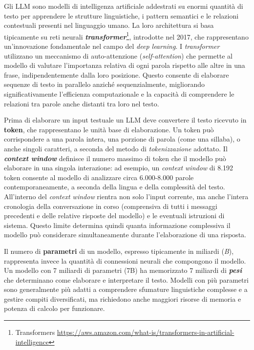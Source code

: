 \documentclass[12pt,twoside]{report}
\begin{document}
Gli LLM sono modelli di intelligenza artificiale addestrati su enormi quantità di testo per apprendere le strutture linguistiche, i pattern semantici e le relazioni contestuali presenti nel linguaggio umano. La loro architettura si basa tipicamente su reti neurali \textbf{\textit{transformer}}\footnote{Transformers \url{https://aws.amazon.com/what-is/transformers-in-artificial-intelligence}}, introdotte nel 2017, che rappresentano un'innovazione fondamentale nel campo del \textit{deep learning}. I \textit{transformer} utilizzano un meccanismo di auto-attenzione (\textit{self-attention}) che permette al modello di valutare l'importanza relativa di ogni parola rispetto alle altre in una frase, indipendentemente dalla loro posizione. Questo consente di elaborare sequenze di testo in parallelo anziché sequenzialmente, migliorando significativamente l'efficienza computazionale e la capacità di comprendere le relazioni tra parole anche distanti tra loro nel testo.

Prima di elaborare un input testuale un LLM deve convertere il testo ricevuto in \textbf{token}, che rappresentano le unità base di elaborazione. Un token può corrispondere a una parola intera, una porzione di parola (come una sillaba), o anche singoli caratteri, a seconda del metodo di \textit{tokenizzazione} adottato. Il \textbf{\textit{context window}} definisce il numero massimo di token che il modello può elaborare in una singola interazione: ad esempio, un \textit{context window} di 8.192 token consente al modello di analizzare circa 6.000-8.000 parole contemporaneamente, a seconda della lingua e della complessità del testo. All'interno del \textit{context window} rientra non solo l'input corrente, ma anche l'intera cronologia della conversazione in corso (comprensiva di tutti i messaggi precedenti e delle relative risposte del modello) e le eventuali istruzioni di sistema. Questo limite determina quindi quanta informazione complessiva il modello può considerare simultaneamente durante l'elaborazione di una risposta.

Il numero di \textbf{parametri} di un modello, espresso tipicamente in miliardi (\textit{B}), rappresenta invece la quantità di connessioni neurali che compongono il modello. Un modello con 7 miliardi di parametri (7B) ha memorizzato 7 miliardi di \textbf{\textit{pesi}} che determinano come elaborare e interpretare il testo. Modelli con più parametri sono generalmente più adatti a comprendere sfumature linguistiche complesse e a gestire compiti diversificati, ma richiedono anche maggiori risorse di memoria e potenza di calcolo per funzionare.
\end{document}
